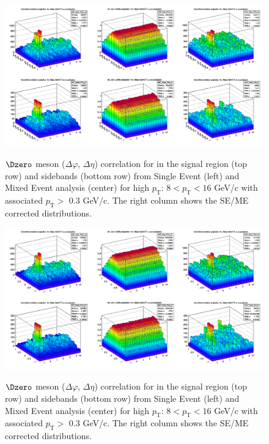 \begin{figure}
\centering
{\includegraphics[width=1\linewidth]{figures/Dzero/Example_SE_ME_D0_Deta10.png}}
 \caption{$\Dzero$ meson ($\Delta\varphi$, $ \Delta\eta$) correlation for in the signal region (top row) and sidebands (bottom row) from  Single Event (left) and Mixed Event analysis (center) for high $p_\mathrm{T}$: $8 < p_\mathrm{T}<16$ GeV/c with associated $p_\mathrm{T} >$ 0.3 GeV/c. The right column shows the SE/ME corrected distributions.}
\label{fig:DzeroME}
\end{figure}

\begin{figure}
\centering
{\includegraphics[width=1\linewidth]{figures/Dzero/Example_SE_ME_D0_Deta12.png}}
 \caption{$\Dzero$ meson ($\Delta\varphi$, $ \Delta\eta$) correlation for in the signal region (top row) and sidebands (bottom row) from  Single Event (left) and Mixed Event analysis (center) for high $p_\mathrm{T}$: $8 < p_\mathrm{T}<16$ GeV/c with associated $p_\mathrm{T} >$ 0.3 GeV/c. The right column shows the SE/ME corrected distributions.}
\label{fig:DzeroMElarge1}
\end{figure}

